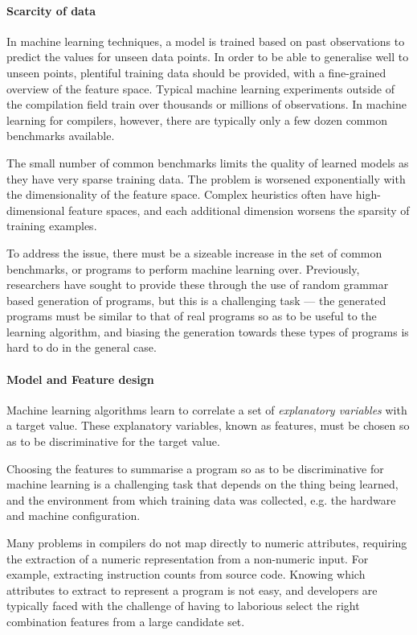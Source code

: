 \paragraph*{Scarcity of data} In machine learning techniques, a model is trained based on past observations to predict the values for unseen data points. In order to be able to generalise well to unseen points, plentiful training data should be provided, with a fine-grained overview of the feature space. Typical machine learning experiments outside of the compilation field train over thousands or millions of observations. In machine learning for compilers, however, there are typically only a few dozen common benchmarks available.

The small number of common benchmarks limits the quality of learned models as they have very sparse training data. The problem is worsened exponentially with the dimensionality of the feature space. Complex heuristics often have high-dimensional feature spaces, and each additional dimension worsens the sparsity of training examples.

To address the issue, there must be a sizeable increase in the set of common benchmarks, or programs to perform machine learning over. Previously, researchers have sought to provide these through the use of random grammar based generation of programs, but this is a challenging task --- the generated programs must be similar to that of real programs so as to be useful to the learning algorithm, and biasing the generation towards these types of programs is hard to do in the general case.

\paragraph*{Model and Feature design} Machine learning algorithms learn to correlate a set of \emph{explanatory variables} with a target value. These explanatory variables, known as features, must be chosen so as to be discriminative for the target value.

Choosing the features to summarise a program so as to be discriminative for machine learning is a challenging task that depends on the thing being learned, and the environment from which training data was collected, e.g. the hardware and machine configuration.

Many problems in compilers do not map directly to numeric attributes, requiring the extraction of a numeric representation from a non-numeric input. For example, extracting instruction counts from source code. Knowing which attributes to extract to represent a program is not easy, and developers are typically faced with the challenge of having to laborious select the right combination features from a large candidate set.

